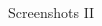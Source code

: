 \documentclass{beamer}
\begin{document}
	\begin{frame}{Screenshots II}
		\begin{columns}[onlytextwidth]
			\begin{column}{0.5\textwidth}
				\centering

\end{column}
\end{columns}
\end{frame}
\end{document}
